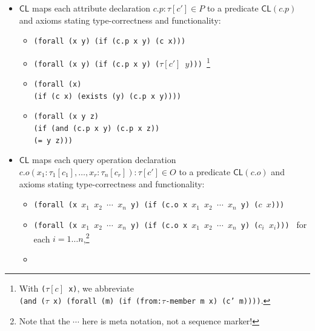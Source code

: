 \documentclass[10pt,fleqn,%
\ifpretendfinal
final%
\else
draft%
\fi,
]{scrreprt}
\newcommand*{\CL}{\ensuremath{\mathsf{CL}}\xspace}
\newcommand{\white}[1]{{\color{white}{#1}}}
\newcommand{\qqquad}{\white{x}\qquad}
\begin{document}
\begin{itemize}
  \item $\CL$ maps each attribute declaration $c.p : \tau[c'] \in P$ to a predicate $\CL(c.p)$ and axioms stating type-correctness
and functionality:
\begin{itemize}
\item
\texttt{(forall (x y) (if (c.p x y) (c x))) }
\item 
\texttt{(forall (x y) (if (c.p x y) ($\tau[c']$ $y$))) }\footnote
{With \texttt{($\tau[c]$ x)}, we abbreviate\\
\texttt{(and ($\tau$ x) (forall (m) (if (from:$\tau$-member m x) (c' m))))}.}
\item 
\texttt{(forall (x)\\
\qqquad  (if (c x) (exists (y) (c.p x y))))}
\item 
\texttt{(forall (x y z)}\\
\qqquad \texttt{(if (and (c.p x y) (c.p x z))}\\
\qqquad\qqquad\texttt{(= y z)))}
\end{itemize}
  \item $\CL$ maps each query operation declaration $c.o(x_1 :
    \tau_1[c_1], \dots, x_r : \tau_n[c_r]) : \tau[c'] \in O$ to a
    predicate $\CL(c.o)$ and axioms stating type-correctness and
    functionality:
\begin{itemize}
\item
\texttt{(forall (x $x_1$ $x_2$ $\cdots$  $x_n$ y) (if (c.o x $x_1$ $x_2$ $\cdots$  $x_n$ y) ($c$ $x$))) }
\item 
\texttt{(forall (x $x_1$ $x_2$ $\cdots$  $x_n$ y) (if (c.o x $x_1$ $x_2$ $\cdots$  $x_n$ y) ($c_i$ $x_i$))) }
for each $i=1\ldots n$,\footnote{Note that the $\cdots$ here is meta notation, not a sequence marker!}
\item 

\end{itemize}
\end{itemize}
\end{document}
